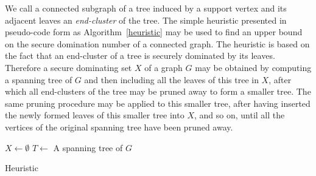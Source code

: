 We call a connected subgraph of a tree induced by a support vertex and its adjacent leaves an {\em end-cluster} of the tree.  The simple heuristic presented in pseudo-code form as Algorithm~\ref{heuristic} may be used to find an upper bound on the secure domination number of a connected graph.  The heuristic is based on the fact that an end-cluster of a tree is securely dominated by its leaves.  Therefore a secure dominating set $X$ of a graph $G$ may be obtained by computing a spanning tree of $G$ and then including all the leaves of this tree in $X$, after which all end-clusters of the tree may be pruned away to form a smaller tree.  The same pruning procedure may be applied to this smaller tree, after having inserted the newly formed leaves of this smaller tree into $X$, and so on, until all the vertices of the original spanning tree have been pruned away.

\begin{algorithm}[htb]
$X \leftarrow \emptyset$\;
$T \leftarrow$ A spanning tree of $G$\;
\Return[$X$]\;
\caption{Heuristic}
\label{heuristic}
\end{algorithm}